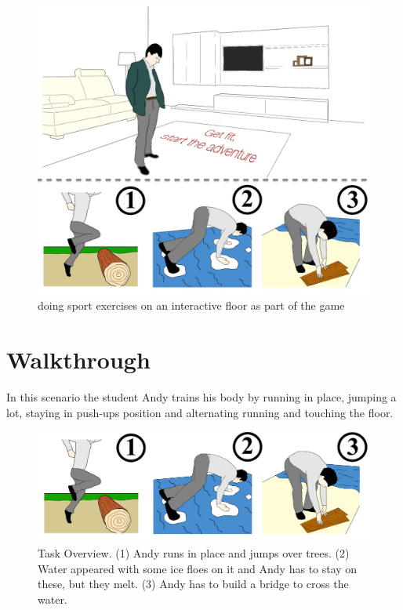 \documentclass{sigchi}
\begin{document}
  \begin{figure}[!t]
    \centering
    \includegraphics[width=\columnwidth]{roto_main}
    \caption{doing sport exercises on an interactive floor as part of the game}
    \label{fig:figure1}
  \end{figure}


\section{Walkthrough}

  In this scenario the student Andy trains his body by running in place, jumping a lot, staying in push-ups position and alternating running and touching the floor.

  \begin{figure}[!htb]
    \includegraphics[width=\linewidth]{Image_11.jpg}
  \endminipage\hfill
    \caption{Task Overview. (1) Andy runs in place and jumps over trees. (2) Water appeared  with some ice floes on it and Andy has to stay on these, but they melt. (3) Andy has to build a bridge to cross the water.}\label{fig:awesome_image3}
  \end{figure}
\end{document}
